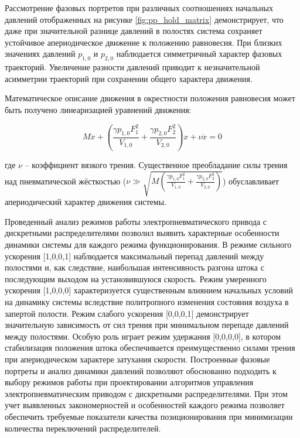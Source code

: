 Рассмотрение фазовых портретов при различных соотношениях начальных давлений отображенных на  рисунке \ref{fig:pp_hold_matrix} демонстрирует,
что даже при значительной разнице давлений в полостях система сохраняет устойчивое апериодическое движение к положению равновесия.
При близких значениях давлений $p_{1,0}$ и $p_{2,0}$ наблюдается симметричный характер фазовых траекторий. Увеличение разности давлений приводит к незначительной асимметрии траекторий при сохранении общего характера движения.

Математическое описание движения в окрестности положения равновесия может быть получено линеаризацией уравнений движения:

\begin{equation*}
	M\ddot{x} + \left(\frac{\gamma p_{1,0}F_1^2}{V_{1,0}} + \frac{\gamma p_{2,0}F_2^2}{V_{2,0}}\right)x + \nu\dot{x} = 0
\end{equation*}

где $\nu$ -- коэффициент вязкого трения. Существенное преобладание силы трения над пневматической жёсткостью
($\nu \gg \sqrt{M\left(\frac{\gamma p_{1,0}F_1^2}{V_{1,0}} + \frac{\gamma p_{2,0}F_2^2}{V_{2,0}}\right)}$) обуславливает апериодический характер движения системы.

Проведенный анализ режимов работы электропневматического привода с дискретными распределителями
позволил выявить характерные особенности динамики системы для каждого режима функционирования.
В режиме сильного ускорения [1,0,0,1] наблюдается максимальный перепад давлений между полостями и,
как следствие, наибольшая интенсивность разгона штока с последующим выходом на установившуюся скорость.
Режим умеренного ускорения [1,0,0,0] характеризуется существенным влиянием начальных условий на динамику
системы вследствие политропного изменения состояния воздуха в запертой полости. Режим слабого ускорения
[0,0,0,1] демонстрирует значительную зависимость от сил трения при минимальном перепаде давлений между полостями.
Особую роль играет режим удержания [0,0,0,0], в котором стабилизация положения штока обеспечивается преимущественно
силами трения при апериодическом характере затухания скорости. Построенные фазовые портреты и анализ динамики давлений
позволяют обоснованно подходить к выбору режимов работы при проектировании алгоритмов управления электропневматическим
приводом с дискретными распределителями. При этом учет выявленных закономерностей и особенностей каждого режима позволяет
обеспечить требуемые показатели качества позиционирования при минимизации количества переключений распределителей.

